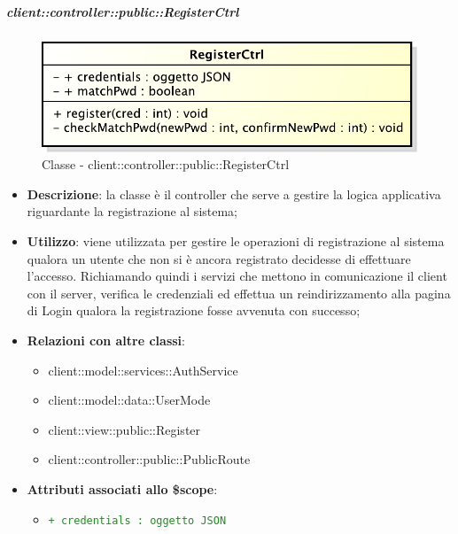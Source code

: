 		\subparagraph{client::controller::public::RegisterCtrl} %
		\label{subp:bdsm_app_client_controller_public_registerctrl}
			\begin{figure}[htbp]
				\centering
				\centerline{\includegraphics[scale=0.7]{./images/client/classes/controller/register_ctrl.pdf}}
				\caption{Classe - client::controller::public::RegisterCtrl}
			\end{figure}
			\begin{itemize}
				\item \textbf{Descrizione}: la classe è il controller che serve a gestire la logica applicativa riguardante la registrazione al sistema;
				\item \textbf{Utilizzo}: viene utilizzata per gestire le operazioni di registrazione al sistema qualora un utente che non si è ancora registrato decidesse di effettuare l'accesso. Richiamando quindi i servizi che mettono in comunicazione il client con il server, verifica le credenziali ed effettua un reindirizzamento alla pagina di Login qualora la registrazione fosse avvenuta con successo;
				\item \textbf{Relazioni con altre classi}:
					\begin{itemize}
						\item client::model::services::AuthService
						\item client::model::data::UserMode
						\item client::view::public::Register
						\item client::controller::public::PublicRoute
					\end{itemize}
				\item \textbf{Attributi associati allo \$scope}:
					\begin{itemize}
						\item \textcolor{forestgreen}{\texttt{+ credentials : oggetto JSON}}


\end{itemize}
\end{itemize}
